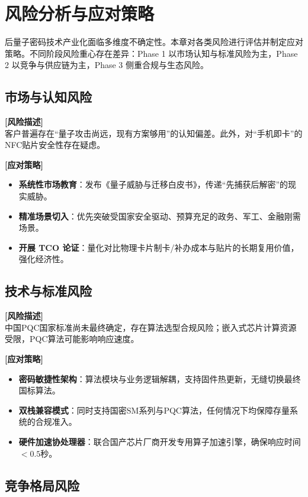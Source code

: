\chapter{风险分析与应对策略}

后量子密码技术产业化面临多维度不确定性。本章对各类风险进行评估并制定应对策略。不同阶段风险重心存在差异：Phase 1 以市场认知与标准风险为主，Phase 2 以竞争与供应链为主，Phase 3 侧重合规与生态风险。

\section{市场与认知风险}

\textbf{[风险描述]} \\
客户普遍存在“量子攻击尚远，现有方案够用”的认知偏差。此外，对“手机即卡”的NFC贴片安全性存在疑虑。

\textbf{[应对策略]}
\begin{itemize}
	\item \textbf{系统性市场教育}：发布《量子威胁与迁移白皮书》，传递“先捕获后解密”的现实威胁。
	\item \textbf{精准场景切入}：优先突破受国家安全驱动、预算充足的政务、军工、金融刚需场景。
	\item \textbf{开展 TCO 论证}：量化对比物理卡片制卡/补办成本与贴片的长期复用价值，强化经济性。
\end{itemize}

\section{技术与标准风险}

\textbf{[风险描述]} \\
中国PQC国家标准尚未最终确定，存在算法选型合规风险；嵌入式芯片计算资源受限，PQC算法可能影响响应速度。

\textbf{[应对策略]}
\begin{itemize}
	\item \textbf{密码敏捷性架构}：算法模块与业务逻辑解耦，支持固件热更新，无缝切换最终国标算法。
	\item \textbf{双栈兼容模式}：同时支持国密SM系列与PQC算法，任何情况下均保障存量系统的合规准入。
	\item \textbf{硬件加速协处理器}：联合国产芯片厂商开发专用算子加速引擎，确保响应时间 $<0.5$秒。
\end{itemize}

\section{竞争格局风险}

